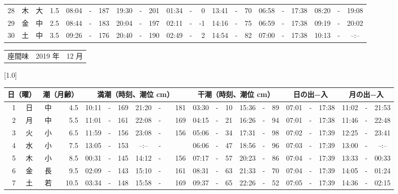 \documentclass[12pt,a4j]{jsarticle}
\begin{document}
\begin{table}[htbp]
\begin{center}
{\begin{tabular}{|rc|cr|ccrccr|ccrccr|ccc|ccc|}
28 & 木 & 大 &  1.5 &  08:04 &-& 187 &  19:30 &-& 201 &  01:34 &-&   0 &  13:41 &-&  70 & 06:58 & -& 17:38 & 08:20 & -& 19:08 \\
29 & 金 & 中 &  2.5 &  08:44 &-& 183 &  20:04 &-& 197 &  02:11 &-&  -1 &  14:16 &-&  75 & 06:59 & -& 17:38 & 09:19 & -& 20:02 \\
30 & 土 & 中 &  3.5 &  09:26 &-& 176 &  20:40 &-& 190 &  02:49 &-&   2 &  14:54 &-&  82 & 07:00 & -& 17:38 & 10:13 & -& --:-- \\
   \hline
   \end{tabular}}
   \end{center}
\end{table}
\newpage
 \begin{table}[htbp]
 \begin{center}
 \begin{tabular}{lcc}
 \LARGE{座間味}  & \large{2019 年} & \large{12 月} \\
 \end{tabular}
 \end{center}
 \begin{center}
    \scalebox{0.7}[1.0]{
    \begin{tabular}{|rc|cr|ccrccr|ccrccr|ccc|ccc|}
    \hline
    \multicolumn{2}{|c|}{日（曜）} & \multicolumn{2}{c|}{潮（月齢）} & \multicolumn{6}{c|}{満潮（時刻、潮位 cm）} & \multicolumn{6}{c|}{干潮（時刻、潮位 cm）} & \multicolumn{3}{c|}{日の出−入} &  \multicolumn{3}{c|}{月の出−入}\\
 \hline
 1 & 日 & 中 &  4.5 &  10:11 &-& 169 &  21:20 &-& 181 &  03:30 &-&  10 &  15:36 &-&  89 & 07:01 & -& 17:38 & 11:02 & -& 21:53 \\
 2 & 月 & 中 &  5.5 &  11:01 &-& 161 &  22:08 &-& 169 &  04:15 &-&  21 &  16:26 &-&  94 & 07:01 & -& 17:38 & 11:46 & -& 22:48 \\
 3 & 火 & 小 &  6.5 &  11:59 &-& 156 &  23:08 &-& 156 &  05:06 &-&  34 &  17:31 &-&  98 & 07:02 & -& 17:39 & 12:25 & -& 23:41 \\
 4 & 水 & 小 &  7.5 &  13:05 &-& 153 &  --:-- &-&~~~~~ &  06:06 &-&  47 &  18:56 &-&  96 & 07:03 & -& 17:39 & 13:00 & -& --:-- \\
 5 & 木 & 小 &  8.5 &  00:31 &-& 145 &  14:12 &-& 156 &  07:17 &-&  57 &  20:23 &-&  86 & 07:04 & -& 17:39 & 13:33 & -& 00:33 \\
 6 & 金 & 長 &  9.5 &  02:09 &-& 143 &  15:10 &-& 161 &  08:31 &-&  63 &  21:33 &-&  70 & 07:04 & -& 17:39 & 14:05 & -& 01:24 \\
 7 & 土 & 若 & 10.5 &  03:34 &-& 148 &  15:58 &-& 169 &  09:37 &-&  65 &  22:26 &-&  52 & 07:05 & -& 17:39 & 14:36 & -& 02:15 \\

\end{tabular}}
\end{center}
\end{table}
\end{document}
